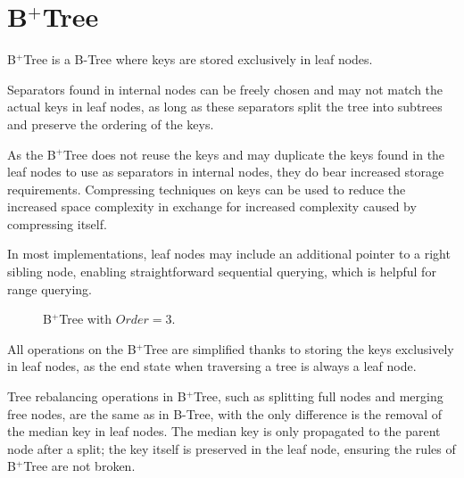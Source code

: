 \section{B$^+$Tree}

\begin{definition}
  B$^+$Tree is a B-Tree where keys are stored exclusively in leaf nodes.
\end{definition}

Separators found in internal nodes can be freely chosen and may not match the actual keys in leaf nodes, as long as these separators split the tree into subtrees and preserve the ordering of the keys.

As the B$^+$Tree does not reuse the keys and may duplicate the keys found in the leaf nodes to use as separators in internal nodes, they do bear increased storage requirements. Compressing techniques on keys can be used to reduce the increased space complexity in exchange for increased complexity caused by compressing itself.

In most implementations, leaf nodes may include an additional pointer to a right sibling node, enabling straightforward sequential querying, which is helpful for range querying.

\begin{figure}[H]
  \centering
  
  \caption{B$^+$Tree with $\mathit{Order} = 3$.}
\end{figure}


All operations on the B$^+$Tree are simplified thanks to storing the keys exclusively in leaf nodes, as the end state when traversing a tree is always a leaf node.

Tree rebalancing operations in B$^+$Tree, such as splitting full nodes and merging free nodes, are the same as in B-Tree, with the only difference is the removal of the median key in leaf nodes. The median key is only propagated to the parent node after a split; the key itself is preserved in the leaf node, ensuring the rules of B$^+$Tree are not broken.